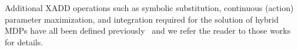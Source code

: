 Additional XADD operations such as symbolic substitution, continuous
(action) parameter maximization, and integration required for the
solution of hybrid MDPs have all been defined
previously~\cite{sanner_uai11,zamani12} and we refer the reader to
those works for details.

